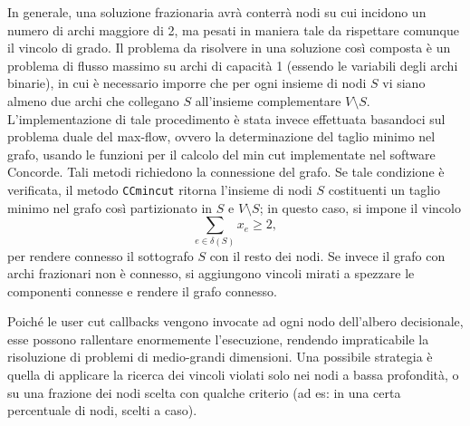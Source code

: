 In generale, una soluzione frazionaria avrà conterrà nodi su cui incidono un numero di archi maggiore di 2, ma pesati in maniera tale da rispettare comunque il vincolo di grado. Il problema da risolvere in una soluzione così composta è un problema di flusso massimo su archi di capacità 1 (essendo le variabili degli archi binarie), in cui è necessario imporre che per ogni insieme di nodi $S$ vi siano almeno due archi che collegano $S$ all'insieme complementare $V \setminus S$. L'implementazione di tale procedimento è stata invece effettuata basandoci sul problema duale del max-flow, ovvero la determinazione del taglio minimo nel grafo, usando le funzioni per il calcolo del min cut implementate nel software Concorde. Tali metodi richiedono la connessione del grafo. Se tale condizione è verificata, il metodo \texttt{CCmincut} ritorna l'insieme di nodi $S$ costituenti un taglio minimo nel grafo così partizionato in $S$ e $V\setminus S$; in questo caso, si impone il vincolo
\begin{equation}
  \sum_{e \in \delta(S)}x_e \geq 2, \label{eqn:flowconst}
\end{equation}
per rendere connesso il sottografo $S$ con il resto dei nodi. Se invece il grafo con archi frazionari non è connesso, si aggiungono vincoli mirati a spezzare le componenti connesse e rendere il grafo connesso.

Poiché le user cut callbacks vengono invocate ad ogni nodo dell'albero decisionale, esse possono rallentare enormemente l'esecuzione, rendendo impraticabile la risoluzione di problemi di medio-grandi dimensioni. Una possibile strategia è quella di applicare la ricerca dei vincoli violati solo nei nodi a bassa profondità, o su una frazione dei nodi scelta con qualche criterio (ad es: in una certa percentuale di nodi, scelti a caso).

